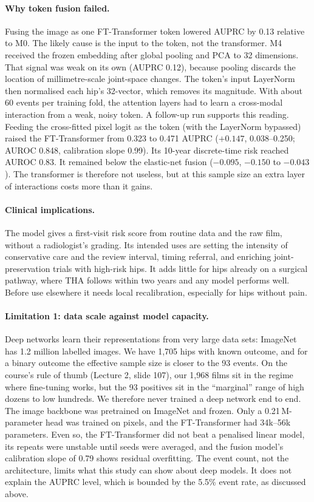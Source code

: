\paragraph{Why token fusion failed.}
Fusing the image as one FT-Transformer token lowered AUPRC by 0.13 relative to M0. The likely cause is the input to
the token, not the transformer. M4 received the frozen embedding after global pooling and PCA to 32 dimensions. That
signal was weak on its own (AUPRC 0.12), because pooling discards the location of millimetre-scale joint-space changes.
The token's input LayerNorm then normalised each hip's 32-vector, which removes its magnitude. With about 60 events
per training fold, the attention layers had to learn a cross-modal interaction from a weak, noisy token. A follow-up
run supports this reading. Feeding the cross-fitted pixel logit as the token (with the LayerNorm bypassed) raised the
FT-Transformer from 0.323 to 0.471 AUPRC ($+0.147$, 0.038--0.250; AUROC 0.848, calibration slope 0.99). Its 10-year
discrete-time risk reached AUROC 0.83. It remained below the elastic-net fusion ($-0.095$, $-0.150$ to $-0.043$). The
transformer is therefore not useless, but at this sample size an extra layer of interactions costs more than it gains.

\paragraph{Clinical implications.}
The model gives a first-visit risk score from routine data and the raw film, without a radiologist's grading. Its
intended uses are setting the intensity of conservative care and the review interval, timing referral, and enriching
joint-preservation trials with high-risk hips. It adds little for hips already on a surgical pathway, where THA follows
within two years and any model performs well. Before use elsewhere it needs local recalibration, especially for hips
without pain.

\paragraph{Limitation 1: data scale against model capacity.}
Deep networks learn their representations from very large data sets: ImageNet has 1.2 million labelled images. We
have 1,705 hips with known outcome, and for a binary outcome the effective sample size is closer to the 93 events. On
the course's rule of thumb (Lecture 2, slide 107), our 1,968 films sit in the regime where fine-tuning works, but the
93 positives sit in the ``marginal'' range of high dozens to low hundreds. We therefore never trained a deep network
end to end. The image backbone was pretrained on ImageNet and frozen. Only a
0.21\,M-parameter head was trained on pixels, and the FT-Transformer had 34k--56k parameters. Even so, the
FT-Transformer did not beat a penalised linear model, its repeats were unstable until seeds were averaged, and the
fusion model's calibration slope of 0.79 shows residual overfitting. The event count, not the architecture, limits
what this study can show about deep models. It does not explain the AUPRC level, which is bounded by the 5.5\% event
rate, as discussed above.

